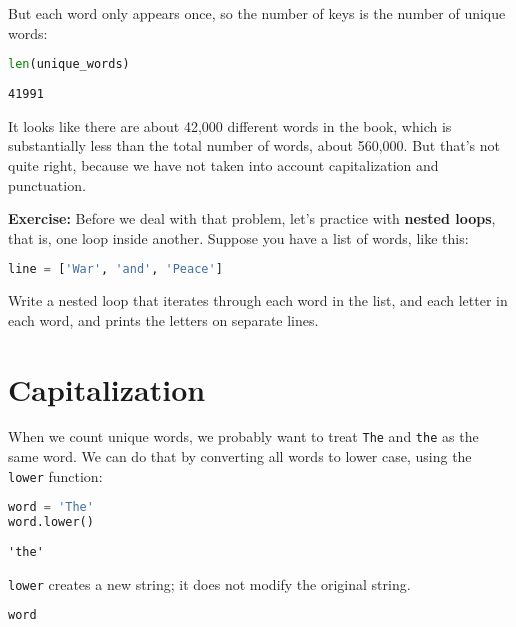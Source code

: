 But each word only appears once, so the number of keys is the number of
unique words:

\begin{lstlisting}[language=Python,style=source]
len(unique_words)
\end{lstlisting}

\begin{lstlisting}[style=output]
41991
\end{lstlisting}

It looks like there are about 42,000 different words in the book, which
is substantially less than the total number of words, about 560,000. But
that's not quite right, because we have not taken into account
capitalization and punctuation.

\textbf{Exercise:} Before we deal with that problem, let's practice with
\textbf{nested loops}, that is, one loop inside another. Suppose you
have a list of words, like this:

\begin{lstlisting}[language=Python,style=source]
line = ['War', 'and', 'Peace']
\end{lstlisting}

Write a nested loop that iterates through each word in the list, and
each letter in each word, and prints the letters on separate lines.

\hypertarget{capitalization}{%
\section{Capitalization}\label{capitalization}}

When we count unique words, we probably want to treat
\passthrough{\lstinline!The!} and \passthrough{\lstinline!the!} as the
same word. We can do that by converting all words to lower case, using
the \passthrough{\lstinline!lower!} function:

\begin{lstlisting}[language=Python,style=source]
word = 'The'
word.lower()
\end{lstlisting}

\begin{lstlisting}[style=output]
'the'
\end{lstlisting}

\passthrough{\lstinline!lower!} creates a new string; it does not modify
the original string.

\begin{lstlisting}[language=Python,style=source]
word
\end{lstlisting}

